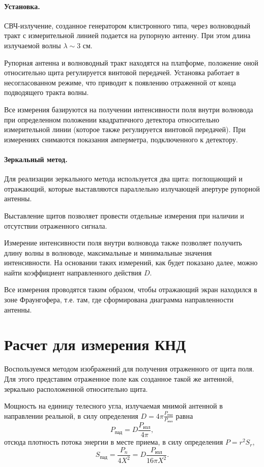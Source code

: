 \documentclass[a4paper,14pt]{extarticle}
\begin{document}
\paragraph{Установка.} СВЧ-излучение, созданное генератором клистронного типа, через волноводный тракт с измерительной линией подается на рупорную антенну. При этом длина излучаемой волны $\lambda \sim 3$ см.

Рупорная антенна и волноводный тракт находятся на платформе, положение оной относительно щита регулируется винтовой передачей. Установка работает в несогласованном режиме, что приводит к появлению отраженной от конца подводящего тракта волны.

Все измерения базируются на получении интенсивности поля внутри волновода при определенном положении квадратичного детектора относительно измерительной линии (которое также регулируется винтовой передачей). При измерениях снимаются показания амперметра, подключенного к детектору.

\paragraph{Зеркальный метод.} Для реализации зеркального метода используется два щита: поглощающий и отражающий, которые выставляются параллельно излучающей апертуре рупорной антенны.

Выставление щитов позволяет провести отдельные измерения при наличии и отсутствии отраженного сигнала.

Измерение интенсивности поля внутри волновода также позволяет получить длину волны в волноводе, максимальные и минимальные значения интенсивности. На основании таких измерений, как будет показано далее, можно найти коэффициент направленного действия $D$. 

Все измерения проводятся таким образом, чтобы отражающий экран находился в зоне Фраунгофера, т.е. там, где сформирована диаграмма направленности антенны.

\newpage

\section{Расчет для измерения КНД}

Воспользуемся методом изображений для получения отраженного от щита поля. Для этого представим отраженное поле как созданное такой же антенной, зеркально расположенной относительно щита.

Мощность на единицу телесного угла, излучаемая мнимой антенной в направлении реальной, в силу определения $D=4\pi\frac{P_\text{пад}}{P_\text{изл}}$ равна
\begin{equation}
  P_\text{пад}=D\frac{P_\text{изл}}{4\pi},
\end{equation}
отсюда плотность потока энергии в месте приема, в силу определения $P=r^2 S_r$,
\begin{equation}
  S_\text{пад}=\frac{P_n}{4X^2}=D\frac{P_\text{изл}}{16\pi X^2}.
\end{equation}
\end{document}
